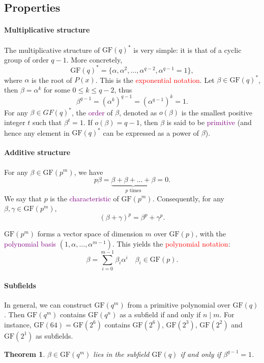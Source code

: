 \documentclass[a4paper, 11pt, openany]{book}
\numberwithin{equation}{section}
\theoremstyle{plain}
\newtheorem{theorem}	[equation]	{Theorem}
\theoremstyle{definition}
\newcommand{\GF}{\mathrm{GF}}
\newcommand{\Important}[1]{\textcolor{red}{#1}}
\newcommand{\Define}[1]{\textcolor{purple}{#1}}
\begin{document}
\subsection{Properties}

\paragraph{Multiplicative structure}
The multiplicative structure of $\GF(q)^*$ is very simple: it is that of a cyclic group of order $q-1$. More concretely, 
\[
    \GF(q)^* = \{\alpha, \alpha^2, \dots, \alpha^{q-2}, \alpha^{q-1} = 1\},
\]
where $\alpha$ is the root of $P(x)$. This is the \Important{exponential notation}. Let $\beta \in \GF(q)^*$, then $\beta = \alpha^k$ for some $0 \le k \le q-2$, thus
\[
    \beta^{q-1} = \left( \alpha^k \right)^{q-1} = \left( \alpha^{q-1} \right)^k = 1.
\]
For any $\beta \in GF(q)^*$, the \Define{order} of $\beta$, denoted as $o(\beta)$ is the smallest positive integer $t$ such that $\beta^t = 1$. If $o(\beta) = q-1$, then $\beta$ is said to be \Define{primitive} (and hence any element in $\GF(q)^*$ can be expressed as a power of $\beta$).



\paragraph{Additive structure}
For any $\beta \in \GF(p^m)$, we have
\[
	p \beta = \underbrace{\beta + \beta + \dots + \beta}_{p \text{ times}} = 0.
\]
We say that $p$ is the \Define{characteristic} of $\GF(p^m)$. Consequently, for any $\beta, \gamma \in \GF(p^m)$, 
\[
	(\beta + \gamma)^p = \beta^p + \gamma^p.
\]

$\GF(p^m)$ forms a vector space of dimension $m$ over $\GF(p)$, with the \Define{polynomial basis} $(1, \alpha, \dots, \alpha^{m-1})$.
This yields the \Important{polynomial notation}:
\[
	\beta = \sum_{i=0}^{m-1} \beta_i \alpha^i \quad \beta_i \in \GF(p).
\]


\paragraph{Subfields}
In general, we can construct $\GF(q^m)$ from a primitive polynomial over $\GF(q)$. Then $\GF(q^m)$ contains $\GF(q^n)$ as a subfield if and only if $n \mid m$. For instance, $\GF(64) = \GF(2^6)$ contains $\GF(2^6)$, $\GF(2^3)$, $\GF(2^2)$ and $\GF(2^1)$ as subfields.

\begin{theorem} 
$\beta \in \GF(q^m)$ lies in the subfield $\GF(q)$ if and only if $\beta^{q-1} = 1$.
\end{theorem}
\end{document}
